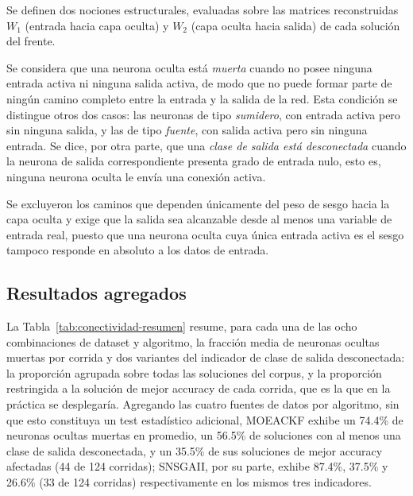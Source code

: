 
Se definen dos nociones estructurales, evaluadas sobre las matrices reconstruidas $W_1$ (entrada hacia capa oculta) y $W_2$ (capa oculta hacia salida) de cada solución del frente.

Se considera que una neurona oculta está \emph{muerta} cuando no posee ninguna entrada activa ni ninguna salida activa, de modo que no puede formar parte de ningún camino completo entre la entrada y la salida de la red. Esta condición se distingue otros dos casos: las neuronas de tipo \emph{sumidero}, con entrada activa pero sin ninguna salida, y las de tipo \emph{fuente}, con salida activa pero sin ninguna entrada. Se dice, por otra parte, que una \emph{clase de salida está desconectada} cuando la neurona de salida correspondiente presenta grado de entrada nulo, esto es, ninguna neurona oculta le envía una conexión activa. 


Se excluyeron los caminos que dependen únicamente del peso de sesgo hacia la capa oculta y exige que la salida sea alcanzable desde al menos una variable de entrada real, puesto que una neurona oculta cuya única entrada activa es el sesgo tampoco responde en absoluto a los datos de entrada.

\subsection{Resultados agregados}
\label{sec:conectividad-resultados}

La Tabla~\ref{tab:conectividad-resumen} resume, para cada una de las ocho combinaciones de dataset y algoritmo, la fracción media de neuronas ocultas muertas por corrida y dos variantes del indicador de clase de salida desconectada: la proporción agrupada sobre todas las soluciones del corpus, y la proporción restringida a la solución de mejor accuracy de cada corrida, que es la que en la práctica se desplegaría. Agregando las cuatro fuentes de datos por algoritmo, sin que esto constituya un test estadístico adicional, MOEACKF exhibe un 74.4\% de neuronas ocultas muertas en promedio, un 56.5\% de soluciones con al menos una clase de salida desconectada, y un 35.5\% de sus soluciones de mejor accuracy afectadas (44 de 124 corridas); SNSGAII, por su parte, exhibe 87.4\%, 37.5\% y 26.6\% (33 de 124 corridas) respectivamente en los mismos tres indicadores.

